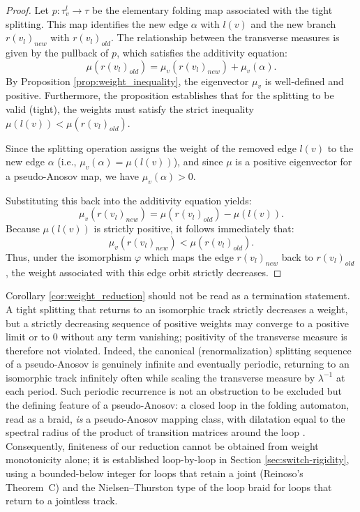 \begin{proof}
    Let $p \colon \tau_v^l \to \tau$ be the elementary folding map associated with the tight splitting. This map identifies the new edge $\alpha$ with $l(v)$ and the new branch $r(v_l)_{new}$ with $r(v_l)_{old}$. The relationship between the transverse measures is given by the pullback of $p$, which satisfies the additivity equation:
    \[
    \mu(r(v_l)_{old}) = \mu_v(r(v_l)_{new}) + \mu_v(\alpha).
    \]
    By Proposition \ref{prop:weight_inequality}, the eigenvector $\mu_v$ is well-defined and positive. Furthermore, the proposition establishes that for the splitting to be valid (tight), the weights must satisfy the strict inequality $\mu(l(v)) < \mu(r(v_l)_{old})$.

    Since the splitting operation assigns the weight of the removed edge $l(v)$ to the new edge $\alpha$ (i.e., $\mu_v(\alpha) = \mu(l(v))$), and since $\mu$ is a positive eigenvector for a pseudo-Anosov map, we have $\mu_v(\alpha) > 0$.

    Substituting this back into the additivity equation yields:
    \[
    \mu_v(r(v_l)_{new}) = \mu(r(v_l)_{old}) - \mu(l(v)).
    \]
    Because $\mu(l(v))$ is strictly positive, it follows immediately that:
    \[
    \mu_v(r(v_l)_{new}) < \mu(r(v_l)_{old}).
    \]
    Thus, under the isomorphism $\varphi$ which maps the edge $r(v_l)_{new}$ back to $r(v_l)_{old}$, the weight associated with this edge orbit strictly decreases.
\end{proof}

\begin{remark}
\label{rem:no_naive_termination}
Corollary \ref{cor:weight_reduction} should not be read as a termination statement. A tight splitting that returns to an isomorphic track strictly decreases a weight, but a strictly decreasing sequence of positive weights may converge to a positive limit or to $0$ without any term vanishing; positivity of the transverse measure is therefore not violated. Indeed, the canonical (renormalization) splitting sequence of a pseudo-Anosov is genuinely infinite and eventually periodic, returning to an isomorphic track infinitely often while scaling the transverse measure by $\lambda^{-1}$ at each period. Such periodic recurrence is not an obstruction to be excluded but the defining feature of a pseudo-Anosov: a closed loop in the folding automaton, read as a braid, \emph{is} a pseudo-Anosov mapping class, with dilatation equal to the spectral radius of the product of transition matrices around the loop \cite{Los2008}. Consequently, finiteness of our reduction cannot be obtained from weight monotonicity alone; it is established loop-by-loop in Section \ref{sec:switch-rigidity}, using a bounded-below integer for loops that retain a joint (Reinoso's Theorem~C) and the Nielsen--Thurston type of the loop braid for loops that return to a jointless track.
\end{remark}

